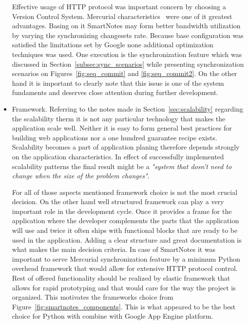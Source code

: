 \begin{itemize}
{Effective usage of HTTP protocol was important concern by choosing a Version Control System. Mercurial characteristics~\cite{google_hg_git_compare} were one of it greatest advantages. Basing on it SmartNotes may form better bandwidth utilization by varying the synchronizing changesets rate. Because base configuration was satisfied the limitations set by Google none additional optimization techniques was used. One execution is the synchronization feature which was discussed in Section~\ref{subsec:sync_scenarios} while presenting synchronization scenarios on Figures~\ref{fig:seq_commit} and \ref{fig:seq_commit2}. On the other hand it is important to clearly note that this issue is one of the system fundaments and deserves close attention during further development.}
\item{Framework. Referring to the notes made in Section~\ref{sec:scalability} regarding the scalability therm it is not any particular technology that makes the application scale well. Neither it is easy to form general best practices for building web applications nor a one hundred guarantee recipe exists. Scalability becomes a part of application planing therefore depends strongly on the application characteristics. In effect of successfully implemented scalability patterns the final result might be a \textit{"system that dosn't need to change when the size of the problem changes"}\cite{mike_malone_quote}. 

For all of those aspects mentioned framework choice is not the most crucial decision. On the other hand well structured framework can play a very important role in the development cycle. Once it provides a frame for the application where the developer complements the parts that the application will use and twice it often ships with functional blocks that are ready to be used in the application. Adding a clear structure and great documentation is what makes the main decision criteria. In case of SmartNotes it was important to serve Mercurial synchronization feature by a minimum Python overhead framework that would allow for extensive HTTP protocol control. Rest of offered functionality should be realized by elastic framework that allows for rapid prototyping and that would care for the way the project is organized. This motivates the frameworks choice from Figure~\ref{fig:smartnotes_components}. This is what appeared to be the best choice for Python with combine with Google App Engine platform.    
}   
\end{itemize}
